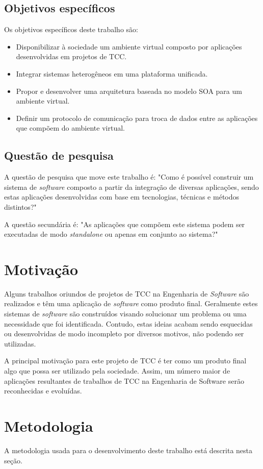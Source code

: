 \subsection{Objetivos específicos}
Os objetivos específicos deste trabalho são:
\begin{itemize}
\item Disponibilizar à sociedade um ambiente virtual composto por aplicações desenvolvidas em projetos de TCC.
\item Integrar sistemas heterogêneos em uma plataforma unificada.
\item Propor e desenvolver uma arquitetura baseada no modelo SOA para um ambiente virtual.
\item Definir um protocolo de comunicação para troca de dados entre as aplicações que compõem do ambiente virtual.
\end{itemize}

\subsection{Questão de pesquisa}
A questão de pesquisa que move este trabalho é: "Como é possível construir um sistema de \textit{software} composto a partir da integração de diversas aplicações, sendo estas aplicações desenvolvidas com base em tecnologias, técnicas e métodos distintos?"

A questão secundária é: "As aplicações que compõem este sistema podem ser executadas de modo \textit{standalone} ou apenas em conjunto ao sistema?"

\section{Motivação}
Alguns trabalhos oriundos de projetos de TCC na Engenharia de \textit{Software} são realizados e têm uma aplicação de \textit{software} como produto final. Geralmente estes sistemas de \textit{software} são construídos visando solucionar um problema ou uma necessidade que foi identificada. Contudo, estas ideias acabam sendo esquecidas ou desenvolvidas de modo incompleto por diversos motivos, não podendo ser utilizadas.

A principal motivação para este projeto de TCC é ter como um produto final algo que possa ser utilizado pela sociedade. Assim, um número maior de aplicações resultantes de trabalhos de TCC na Engenharia de Software serão reconhecidas e evoluídas. 

\section{Metodologia}
A metodologia usada para o desenvolvimento deste trabalho está descrita nesta seção. 

